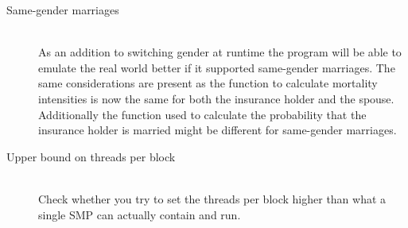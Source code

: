 \begin{description}
\item[Same-gender marriages] \hfill \\
As an addition to switching gender at runtime the program will be able to emulate the real world better if it supported same-gender marriages. The same considerations are present as the function to calculate mortality intensities is now the same for both the insurance holder and the spouse. Additionally the function used to calculate the probability that the insurance holder is married might be different for same-gender marriages.

\item[Upper bound on threads per block] \hfill \\
Check whether you try to set the threads per block higher than what a single SMP can actually contain and run.

\end{description}
